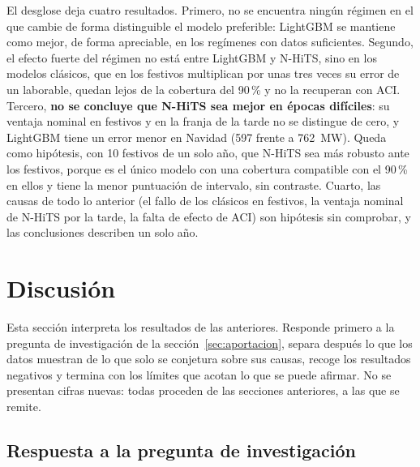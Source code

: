El desglose deja cuatro resultados. Primero, no se encuentra ningún régimen en
el que cambie de forma distinguible el modelo preferible: LightGBM se mantiene
como mejor, de forma apreciable, en los regímenes con datos suficientes. Segundo,
el efecto fuerte del régimen no está entre LightGBM y N-HiTS, sino en los
modelos clásicos, que en los festivos multiplican por unas tres veces su error
de un laborable, quedan lejos de la cobertura del 90\,\% y no la recuperan con
ACI. Tercero, \textbf{no se concluye que N-HiTS sea mejor en épocas difíciles}:
su ventaja nominal en festivos y en la franja de la tarde no se distingue de cero,
y LightGBM tiene un error menor en Navidad (597 frente a 762~MW). Queda como
hipótesis, con 10 festivos de un solo año, que N-HiTS sea más robusto ante los
festivos, porque es el único modelo con una cobertura compatible con el 90\,\%
en ellos y tiene la menor puntuación de intervalo, sin contraste. Cuarto, las
causas de todo lo anterior (el fallo de los clásicos en festivos, la ventaja
nominal de N-HiTS por la tarde, la falta de efecto de ACI) son hipótesis sin
comprobar, y las conclusiones describen un solo año.

\section{Discusión}\label{sec:discusion}

Esta sección interpreta los resultados de las anteriores. Responde primero a la
pregunta de investigación de la sección~\ref{sec:aportacion}, separa después lo
que los datos muestran de lo que solo se conjetura sobre sus causas, recoge los
resultados negativos y termina con los límites que acotan lo que se puede
afirmar. No se presentan cifras nuevas: todas proceden de las secciones
anteriores, a las que se remite.

\subsection{Respuesta a la pregunta de investigación}\label{sec:disc-respuesta}

